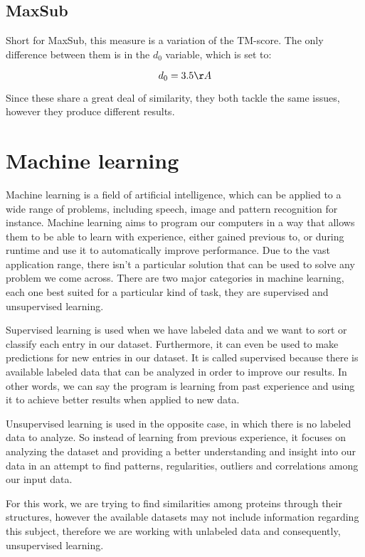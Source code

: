 \subsection{MaxSub}

Short for \gls{MaxSub}, this measure is a variation of the TM-score. The only difference between them is in the $d_0$ variable, which is set to:

$$d_0 = 3.5\AA$$ 

Since these share a great deal of similarity, they both tackle the same issues, however they produce different results. 

\section{Machine learning}
Machine learning \cite{tommitchell} \cite{ethemalpaydin2010} is a field of artificial intelligence, which can be applied to a wide range of problems, including speech, image and pattern recognition for instance. Machine learning aims to program our computers in a way that allows them to be able to learn with experience, either gained previous to, or during runtime and use it to automatically improve performance. Due to the vast application range, there isn't a particular solution that can be used to solve any problem we come across. There are two major categories in machine learning, each one best suited for a particular kind of task, they are supervised and unsupervised learning.

Supervised learning is used when we have labeled data and we want to sort or classify each entry in our dataset. Furthermore, it can even be used to make predictions for new entries in our dataset. It is called supervised because there is available labeled data that can be analyzed in order to improve our results. In other words, we can say the program is learning from past experience and using it to achieve better results when applied to new data.

Unsupervised learning is used in the opposite case, in which there is no labeled data to analyze. So instead of learning from previous experience, it focuses on analyzing the dataset and providing a better understanding and insight into our data in an attempt to find patterns, regularities, outliers and correlations among our input data.

For this work, we are trying to find similarities among proteins through their structures, however the available datasets may not include information regarding this subject, therefore we are working with unlabeled data and consequently, unsupervised learning.

